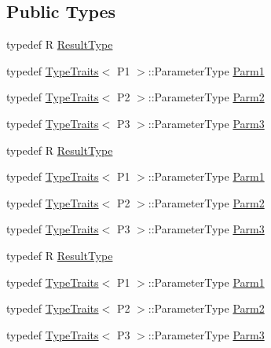\subsection*{Public Types}
\begin{DoxyCompactItemize}
\item 
typedef R \mbox{\hyperlink{classUtil_1_1FunctorImpl_3_01R_00_01TYPELIST__3_07P1_00_01P2_00_01P3_08_4_aac45953d9a4169ab320e3832125e5f6b}{Result\+Type}}
\item 
typedef \mbox{\hyperlink{classUtil_1_1TypeTraits}{Type\+Traits}}$<$ P1 $>$\+::Parameter\+Type \mbox{\hyperlink{classUtil_1_1FunctorImpl_3_01R_00_01TYPELIST__3_07P1_00_01P2_00_01P3_08_4_af62467f5d0a091d03f5db9c7fbeb1f96}{Parm1}}
\item 
typedef \mbox{\hyperlink{classUtil_1_1TypeTraits}{Type\+Traits}}$<$ P2 $>$\+::Parameter\+Type \mbox{\hyperlink{classUtil_1_1FunctorImpl_3_01R_00_01TYPELIST__3_07P1_00_01P2_00_01P3_08_4_a0f99a7ea311c3cc8934098ce9fe769c1}{Parm2}}
\item 
typedef \mbox{\hyperlink{classUtil_1_1TypeTraits}{Type\+Traits}}$<$ P3 $>$\+::Parameter\+Type \mbox{\hyperlink{classUtil_1_1FunctorImpl_3_01R_00_01TYPELIST__3_07P1_00_01P2_00_01P3_08_4_a909cd0ef75e4c16e44eb5ae652144d00}{Parm3}}
\item 
typedef R \mbox{\hyperlink{classUtil_1_1FunctorImpl_3_01R_00_01TYPELIST__3_07P1_00_01P2_00_01P3_08_4_aac45953d9a4169ab320e3832125e5f6b}{Result\+Type}}
\item 
typedef \mbox{\hyperlink{classUtil_1_1TypeTraits}{Type\+Traits}}$<$ P1 $>$\+::Parameter\+Type \mbox{\hyperlink{classUtil_1_1FunctorImpl_3_01R_00_01TYPELIST__3_07P1_00_01P2_00_01P3_08_4_af62467f5d0a091d03f5db9c7fbeb1f96}{Parm1}}
\item 
typedef \mbox{\hyperlink{classUtil_1_1TypeTraits}{Type\+Traits}}$<$ P2 $>$\+::Parameter\+Type \mbox{\hyperlink{classUtil_1_1FunctorImpl_3_01R_00_01TYPELIST__3_07P1_00_01P2_00_01P3_08_4_a0f99a7ea311c3cc8934098ce9fe769c1}{Parm2}}
\item 
typedef \mbox{\hyperlink{classUtil_1_1TypeTraits}{Type\+Traits}}$<$ P3 $>$\+::Parameter\+Type \mbox{\hyperlink{classUtil_1_1FunctorImpl_3_01R_00_01TYPELIST__3_07P1_00_01P2_00_01P3_08_4_a909cd0ef75e4c16e44eb5ae652144d00}{Parm3}}
\item 
typedef R \mbox{\hyperlink{classUtil_1_1FunctorImpl_3_01R_00_01TYPELIST__3_07P1_00_01P2_00_01P3_08_4_aac45953d9a4169ab320e3832125e5f6b}{Result\+Type}}
\item 
typedef \mbox{\hyperlink{classUtil_1_1TypeTraits}{Type\+Traits}}$<$ P1 $>$\+::Parameter\+Type \mbox{\hyperlink{classUtil_1_1FunctorImpl_3_01R_00_01TYPELIST__3_07P1_00_01P2_00_01P3_08_4_af62467f5d0a091d03f5db9c7fbeb1f96}{Parm1}}
\item 
typedef \mbox{\hyperlink{classUtil_1_1TypeTraits}{Type\+Traits}}$<$ P2 $>$\+::Parameter\+Type \mbox{\hyperlink{classUtil_1_1FunctorImpl_3_01R_00_01TYPELIST__3_07P1_00_01P2_00_01P3_08_4_a0f99a7ea311c3cc8934098ce9fe769c1}{Parm2}}
\item 
typedef \mbox{\hyperlink{classUtil_1_1TypeTraits}{Type\+Traits}}$<$ P3 $>$\+::Parameter\+Type \mbox{\hyperlink{classUtil_1_1FunctorImpl_3_01R_00_01TYPELIST__3_07P1_00_01P2_00_01P3_08_4_a909cd0ef75e4c16e44eb5ae652144d00}{Parm3}}
\end{DoxyCompactItemize}
